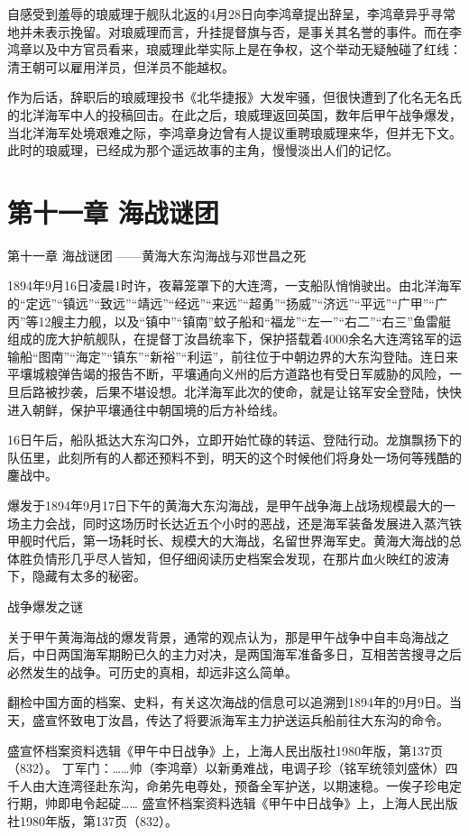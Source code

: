 \documentclass[12pt,UTF8]{ctexbook}
\begin{document}
自感受到羞辱的琅威理于舰队北返的4月28日向李鸿章提出辞呈，李鸿章异乎寻常地并未表示挽留。对琅威理而言，升挂提督旗与否，是事关其名誉的事件。而在李鸿章以及中方官员看来，琅威理此举实际上是在争权，这个举动无疑触碰了红线：清王朝可以雇用洋员，但洋员不能越权。

作为后话，辞职后的琅威理投书《北华捷报》大发牢骚，但很快遭到了化名无名氏的北洋海军中人的投稿回击。在此之后，琅威理返回英国，数年后甲午战争爆发，当北洋海军处境艰难之际，李鸿章身边曾有人提议重聘琅威理来华，但并无下文。此时的琅威理，已经成为那个遥远故事的主角，慢慢淡出人们的记忆。

\chapter{第十一章 海战谜团}

第十一章
海战谜团
——黄海大东沟海战与邓世昌之死

1894年9月16日凌晨1时许，夜幕笼罩下的大连湾，一支船队悄悄驶出。由北洋海军的“定远”“镇远”“致远”“靖远”“经远”“来远”“超勇”“扬威”“济远”“平远”“广甲”“广丙”等12艘主力舰，以及“镇中”“镇南”蚊子船和“福龙”“左一”“右二”“右三”鱼雷艇组成的庞大护航舰队，在提督丁汝昌统率下，保护搭载着4000余名大连湾铭军的运输船“图南”“海定”“镇东”“新裕”“利运”，前往位于中朝边界的大东沟登陆。连日来平壤城粮弹告竭的报告不断，平壤通向义州的后方道路也有受日军威胁的风险，一旦后路被抄袭，后果不堪设想。北洋海军此次的使命，就是让铭军安全登陆，快快进入朝鲜，保护平壤通往中朝国境的后方补给线。

16日午后，船队抵达大东沟口外，立即开始忙碌的转运、登陆行动。龙旗飘扬下的队伍里，此刻所有的人都还预料不到，明天的这个时候他们将身处一场何等残酷的鏖战中。

爆发于1894年9月17日下午的黄海大东沟海战，是甲午战争海上战场规模最大的一场主力会战，同时这场历时长达近五个小时的恶战，还是海军装备发展进入蒸汽铁甲舰时代后，第一场耗时长、规模大的大海战，名留世界海军史。黄海大海战的总体胜负情形几乎尽人皆知，但仔细阅读历史档案会发现，在那片血火映红的波涛下，隐藏有太多的秘密。

战争爆发之谜

关于甲午黄海海战的爆发背景，通常的观点认为，那是甲午战争中自丰岛海战之后，中日两国海军期盼已久的主力对决，是两国海军准备多日，互相苦苦搜寻之后必然发生的战争。可历史的真相，却远非这么简单。

翻检中国方面的档案、史料，有关这次海战的信息可以追溯到1894年的9月9日。当天，盛宣怀致电丁汝昌，传达了将要派海军主力护送运兵船前往大东沟的命令。

盛宣怀档案资料选辑《甲午中日战争》上，上海人民出版社1980年版，第137页（832）。
丁军门：……帅（李鸿章）以新勇难战，电调子珍（铭军统领刘盛休）四千人由大连湾径赴东沟，命弟先电尊处，预备全军护送，以期速稳。一俟子珍电定行期，帅即电令起碇…… 盛宣怀档案资料选辑《甲午中日战争》上，上海人民出版社1980年版，第137页（832）。
\end{document}
